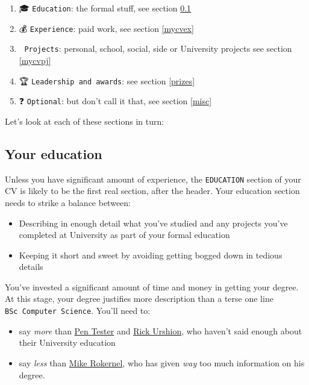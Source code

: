\documentclass[
]{book}
\providecommand{\tightlist}{%
  \setlength{\itemsep}{0pt}\setlength{\parskip}{0pt}}
\begin{document}
\begin{enumerate}
\def\labelenumi{\arabic{enumi}.}
\tightlist
\item
  🎓 \texttt{Education}: the formal stuff, see section \ref{mycved}
\item
  💰 \texttt{Experience}: paid work, see section \ref{mycvex}
\item
  💪 \texttt{Projects}: personal, school, social, side or University projects see section \ref{mycvpj}
\item
  🏆 \texttt{Leadership\ and\ awards}: see section \ref{prizes}
\item
  ❓ \texttt{Optional}: but don't call it that, see section \ref{misc}
\end{enumerate}

Let's look at each of these sections in turn:

\hypertarget{mycved}{%
\subsection{Your education}\label{mycved}}

Unless you have significant amount of experience, the \texttt{EDUCATION} section of your CV is likely to be the first real section, after the header. Your education section needs to strike a balance between:

\begin{itemize}
\tightlist
\item
  Describing in enough detail what you've studied and any projects you've completed at University as part of your formal education
\item
  Keeping it short and sweet by avoiding getting bogged down in tedious details
\end{itemize}

You've invested a significant amount of time and money in getting your degree. At this stage, your degree justifies more description than a terse one line \texttt{BSc\ Computer\ Science}. You'll need to:

\begin{itemize}
\tightlist
\item
  say \emph{more} than \href{Penelope_Tester.pdf}{Pen Tester} and \href{Rick_Urshion.pdf}{Rick Urshion}, who haven't said enough about their University education
\item
  say \emph{less} than \href{Mike_Rokernel.pdf}{Mike Rokernel}, who has given \emph{way} too much information on his degree.
\end{itemize}
\end{document}
